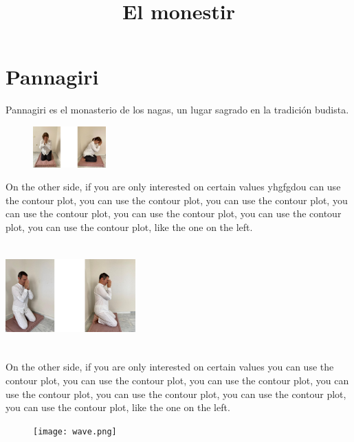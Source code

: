 \documentclass{article}
\begin{document}
\title{El monestir}
\begin{titlepage}
    \centering
    \vspace*{2cm}
    \Huge
    \vfill
    \vspace{0.8cm}
\end{titlepage}
\maketitle
\section{Pannagiri}
Pannagiri es el monasterio de los nagas, un lugar sagrado en la tradición budista.
\begin{figure} %
    \centering
    \includegraphics[width=0.25\textwidth]{vandami_woman.jpg}
\end{figure}
On the other side, if you are only interested on
certain values yhgfgdou can use the contour plot, you 
can use the contour plot, you can use the contour 
plot, you can use the contour plot, you can use 
the contour plot, you can use the contour plot, 
you can use the contour plot, like the one on the left.

\includegraphics[width=5cm, height=4cm]{vandami_man.jpg}

On the other side, if you are only interested on 
certain values you can use the contour plot, you 
can use the contour plot, you can use the contour 
plot, you can use the contour plot, you can use the 
contour plot, you can use the contour plot, 
you can use the contour plot, 
like the one on the left.

\begin{figure} %
    \centering
    \texttt{[image: wave.png]}
\end{figure}
\end{document}
